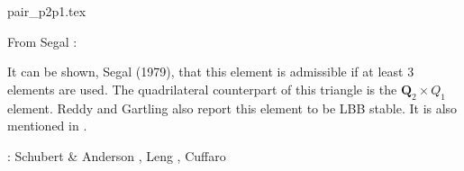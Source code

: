 \begin{flushright} {\tiny {\color{gray} pair\_p2p1.tex}} \end{flushright}

\noindent
\begin{minipage}{0.54\textwidth}
From Segal \cite{segal}: 

It can be shown, Segal (1979), that this element is admissible if at least 3 elements 
are used. The quadrilateral counterpart of this triangle is the ${\bm Q}_2\times Q_1$ element.
Reddy and Gartling \cite[p179]{reddybook2} also report this element to be LBB stable.
It is also mentioned in \textcite{nath93}.

\Literature: Schubert \& Anderson \cite{scan85}, Leng \etal \cite{lejx14}, Cuffaro \etal \cite{cump20}
\end{minipage}
\hfill
\begin{minipage}{0.42\textwidth}
\begin{center}

\end{center}
\end{minipage}




